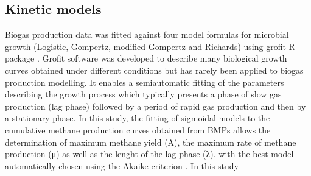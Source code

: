 \subsection{Kinetic models}
Biogas production data was fitted against four model formulas for microbial growth (Logistic, Gompertz, modified Gompertz and Richards) using grofit R package \cite{Kahm_2010}. Grofit software was developed to describe many biological growth curves obtained under different conditions but has rarely been applied to biogas production modelling. It enables a semiautomatic fitting of the parameters describing the growth process which typically presents a phase of slow gas production (lag phase) followed by a period of rapid gas production and then by a stationary phase. In this study, the fitting of sigmoidal models to the cumulative methane production curves obtained from BMPs allows the determination of maximum methane yield (A), the maximum rate of methane production (μ) as well as the lenght of the lag phase (λ).  with the best model automatically chosen using the Akaike criterion \cite{Hasenbrink_2006}. In this study